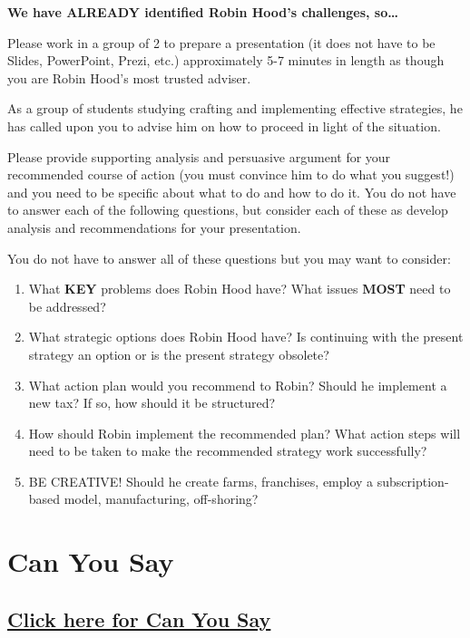 \documentclass[
]{book}
\providecommand{\tightlist}{%
  \setlength{\itemsep}{0pt}\setlength{\parskip}{0pt}}
\begin{document}
\textbf{We have ALREADY identified Robin Hood's challenges, so\ldots{}}

Please work in a group of 2 to prepare a presentation (it does not have to be Slides, PowerPoint, Prezi, etc.) approximately 5-7 minutes in length as though you are Robin Hood's most trusted adviser.

As a group of students studying crafting and implementing effective strategies, he has called upon you to advise him on how to proceed in light of the situation.

Please provide supporting analysis and persuasive argument for your recommended course of action (you must convince him to do what you suggest!) and you need to be specific about what to do and how to do it. You do not have to answer each of the following questions, but consider each of these as develop analysis and recommendations for your presentation.

You do not have to answer all of these questions but you may want to consider:

\begin{enumerate}
\def\labelenumi{\arabic{enumi}.}
\tightlist
\item
  What \textbf{KEY} problems does Robin Hood have? What issues \textbf{MOST} need to be addressed?
\item
  What strategic options does Robin Hood have? Is continuing with the present strategy an option or is the present strategy obsolete?
\item
  What action plan would you recommend to Robin? Should he implement a new tax? If so, how should it be structured?
\item
  How should Robin implement the recommended plan? What action steps will need to be taken to make the recommended strategy work successfully?
\item
  BE CREATIVE! Should he create farms, franchises, employ a subscription-based model, manufacturing, off-shoring?
\end{enumerate}

\hypertarget{can-you-say}{%
\chapter{Can You Say}\label{can-you-say}}

\hypertarget{click-here-for-can-you-say}{%
\section{\texorpdfstring{\href{https://strategygurus.com/wp-content/uploads/2020/05/Can-you-say-what-your-strategy-is.pdf}{Click here for Can You Say}}{Click here for Can You Say}}\label{click-here-for-can-you-say}}
\end{document}
